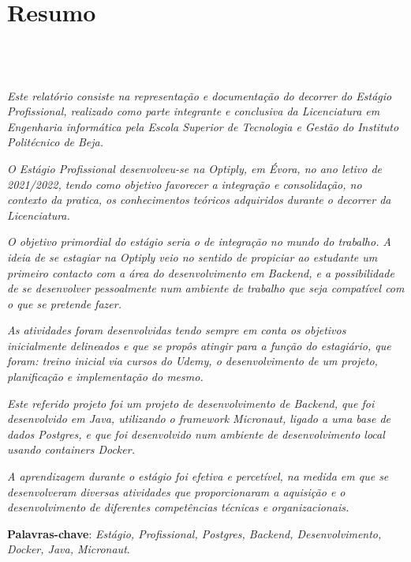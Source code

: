 \chapter{Resumo}
\section*{\textit{\TITULO}\\  {\small{\textit{\SUBTITULO}}}}

\textit{Este relatório consiste na representação e documentação do decorrer do Estágio Profissional, realizado como parte integrante e conclusiva da Licenciatura em Engenharia informática pela Escola Superior de Tecnologia e Gestão do Instituto Politécnico de Beja.}

\textit{O Estágio Profissional desenvolveu-se na Optiply, em Évora, no ano letivo de 2021/2022, tendo como objetivo favorecer a integração e consolidação, no contexto da pratica, os conhecimentos teóricos adquiridos durante o decorrer da Licenciatura.}

\textit{O objetivo primordial do estágio seria o de integração no mundo do trabalho. A ideia de se estagiar na Optiply veio no sentido de propiciar ao estudante um primeiro contacto com a área do desenvolvimento em Backend, e a possibilidade de se desenvolver pessoalmente num ambiente de trabalho que seja compatível com o que se pretende fazer.}

\textit{As atividades foram desenvolvidas tendo sempre em conta os objetivos inicialmente delineados e que se propôs atingir para a função do estagiário, que foram: treino inicial via cursos do Udemy, o desenvolvimento de um projeto, planificação e implementação do mesmo.}

\textit{Este referido projeto foi um projeto de desenvolvimento de Backend, que foi desenvolvido em Java, utilizando o framework Micronaut, ligado a uma base de dados Postgres, e que foi desenvolvido num ambiente de desenvolvimento local usando containers Docker.}

\textit{A aprendizagem durante o estágio foi efetiva e percetível, na medida em que se desenvolveram diversas atividades que proporcionaram a aquisição e o desenvolvimento de diferentes competências técnicas e organizacionais.}

\textbf{Palavras-chave}: \textit{Estágio, Profissional, Postgres, Backend, Desenvolvimento, Docker, Java, Micronaut}.
